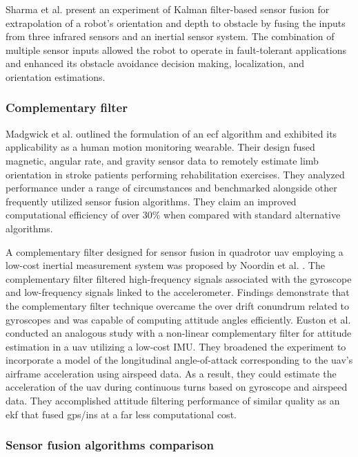 Sharma et al. \cite{sharma2014sensor} present an experiment of Kalman filter-based sensor fusion for extrapolation of a robot's orientation and depth to obstacle by fusing the inputs from three infrared sensors and an inertial sensor system. The combination of multiple sensor inputs allowed the robot to operate in fault-tolerant applications and enhanced its obstacle avoidance decision making, localization, and orientation estimations.

\subsubsection{Complementary filter}

Madgwick et al. \cite{madgwick2020extended} outlined the formulation of an \acrfull{ecf} algorithm and exhibited its applicability as a human motion monitoring wearable. Their design fused magnetic, angular rate, and gravity sensor data to remotely estimate limb orientation in stroke patients performing rehabilitation exercises. They analyzed performance under a range of circumstances and benchmarked alongside other frequently utilized sensor fusion algorithms. They claim an improved computational efficiency of over 30\% when compared with standard alternative algorithms.

A complementary filter designed for sensor fusion in quadrotor \acrshort{uav} employing a low-cost inertial measurement system was proposed by Noordin et al. \cite{noordin2018sensor}. The complementary filter filtered high-frequency signals associated with the gyroscope and low-frequency signals linked to the accelerometer. Findings demonstrate that the complementary filter technique overcame the over drift conundrum related to gyroscopes and was capable of computing attitude angles efficiently.
Euston et al. \cite{euston2008complementary} conducted an analogous study with a non-linear complementary filter for attitude estimation in a \acrshort{uav} utilizing a low-cost IMU. They broadened the experiment to incorporate a model of the longitudinal angle-of-attack corresponding to the \acrshort{uav}'s airframe acceleration using airspeed data. As a result, they could estimate the acceleration of the \acrshort{uav} during continuous turns based on gyroscope and airspeed data. They accomplished attitude filtering performance of similar quality as an \acrshort{ekf} that fused \acrshort{gps}/\acrshort{ins} at a far less computational cost.

\subsubsection{Sensor fusion algorithms comparison}

